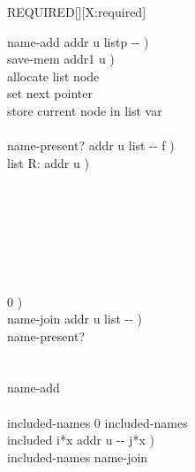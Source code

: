 \begin{worddef}{}{REQUIRED}[][X:required]
\begin{defer}
		\word{:} name-add  addr u listp -{}- ) \\
		\tab {} save-mem  addr1 u ) \\
		     allocate list node \\
		\tab {}   \word{!}  set next pointer \\
		\tab {}  \word{!}  store current node in list var \\
		\tab {}  \word{;} \\

		\word{:} name-present?  addr u list -{}- f ) \\
		\tab \word{ROT}     list R: addr u ) \\
		\tab[2]  \\
		\tab {} \\
		\tab[2]        \\
		\tab[3]		     \\
		\tab[2]	 \\
		\tab[2]  \\
		\tab {} \\
		\tab {}  0 )   \word{;} \\

		\word{:} name-join  addr u list -{}- ) \\
		\tab {}    name-present?  \\
		\tab[2]    \\
	    \tab {} \\
		\tab[2]  name-add \\
		\tab {} \word{;} \\

		 included-names 0 included-names \word{!} \\

		\word{:} included  i*x addr u -{}- j*x ) \\
		\tab {} included-names name-join \\
		\tab {} \word{;} \\


\end{defer}
\end{worddef}
